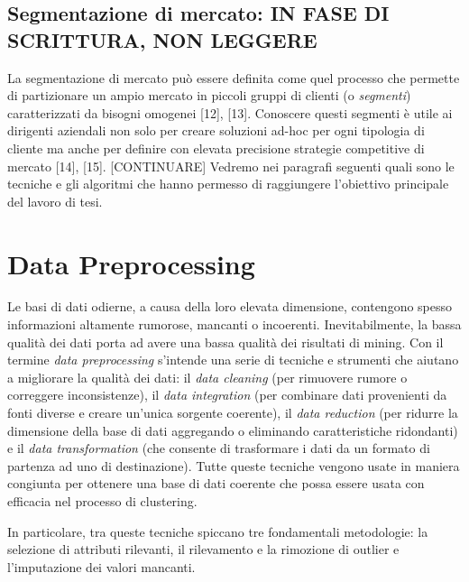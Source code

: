 \subsection{Segmentazione di mercato: IN FASE DI SCRITTURA, NON LEGGERE}
La segmentazione di mercato pu\`o essere definita come quel processo che permette di partizionare un ampio mercato in piccoli gruppi di clienti (o \textit{segmenti}) caratterizzati da bisogni omogenei [12], [13]. Conoscere questi segmenti \`e utile ai dirigenti aziendali non solo per creare soluzioni ad-hoc per ogni tipologia di cliente ma anche per definire con elevata precisione strategie competitive di mercato [14], [15].
[CONTINUARE]
Vedremo nei paragrafi seguenti quali sono le tecniche e gli algoritmi che hanno permesso di raggiungere l'obiettivo principale del lavoro di tesi.

\section{Data Preprocessing}
Le basi di dati odierne, a causa della loro elevata dimensione, contengono spesso informazioni altamente rumorose, mancanti o incoerenti. Inevitabilmente, la bassa qualit\`a dei dati porta ad avere una bassa qualit\`a dei risultati di mining. Con il termine \textit{data preprocessing} s'intende una serie di tecniche e strumenti che aiutano a migliorare la qualit\`a dei dati: il \textit{data cleaning} (per rimuovere rumore o correggere inconsistenze), il \textit{data integration} (per combinare dati provenienti da fonti diverse e creare un'unica sorgente coerente), il \textit{data reduction}  (per ridurre la dimensione della base di dati aggregando o eliminando caratteristiche ridondanti) e il \textit{data transformation} (che consente di trasformare i dati da un formato di partenza ad uno di destinazione).
Tutte queste tecniche vengono usate in maniera congiunta per ottenere una base di dati coerente che possa essere usata con efficacia nel processo di clustering.

In particolare, tra queste tecniche spiccano tre fondamentali metodologie: la selezione di attributi rilevanti, il rilevamento e la rimozione di outlier e l'imputazione dei valori mancanti.

